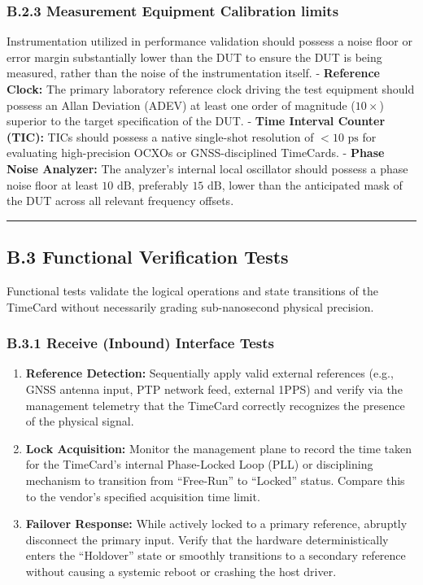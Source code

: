 \documentclass[
]{article}
\begin{document}
\subsubsection{B.2.3 Measurement Equipment Calibration
limits}\label{b.2.3-measurement-equipment-calibration-limits}

Instrumentation utilized in performance validation should possess a
noise floor or error margin substantially lower than the DUT to ensure
the DUT is being measured, rather than the noise of the instrumentation
itself. - \textbf{Reference Clock:} The primary laboratory reference
clock driving the test equipment should possess an Allan Deviation
(ADEV) at least one order of magnitude (\(10\times\)) superior to the
target specification of the DUT. - \textbf{Time Interval Counter (TIC):}
TICs should possess a native single-shot resolution of \(<10\text{ ps}\)
for evaluating high-precision OCXOs or GNSS-disciplined TimeCards. -
\textbf{Phase Noise Analyzer:} The analyzer's internal local oscillator
should possess a phase noise floor at least \(10\text{ dB}\), preferably
\(15\text{ dB}\), lower than the anticipated mask of the DUT across all
relevant frequency offsets.

\begin{center}\rule{0.5\linewidth}{0.5pt}\end{center}

\subsection{B.3 Functional Verification
Tests}\label{b.3-functional-verification-tests}

Functional tests validate the logical operations and state transitions
of the TimeCard without necessarily grading sub-nanosecond physical
precision.

\subsubsection{B.3.1 Receive (Inbound) Interface
Tests}\label{b.3.1-receive-inbound-interface-tests}

\begin{enumerate}
\item
  \textbf{Reference Detection:} Sequentially apply valid external
  references (e.g., GNSS antenna input, PTP network feed, external 1PPS)
  and verify via the management telemetry that the TimeCard correctly
  recognizes the presence of the physical signal.
\item
  \textbf{Lock Acquisition:} Monitor the management plane to record the
  time taken for the TimeCard's internal Phase-Locked Loop (PLL) or
  disciplining mechanism to transition from ``Free-Run'' to ``Locked''
  status. Compare this to the vendor's specified acquisition time limit.
\item
  \textbf{Failover Response:} While actively locked to a primary
  reference, abruptly disconnect the primary input. Verify that the
  hardware deterministically enters the ``Holdover'' state or smoothly
  transitions to a secondary reference without causing a systemic reboot
  or crashing the host driver.
\end{enumerate}
\end{document}
